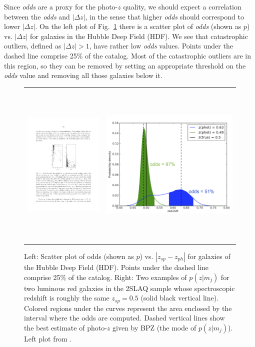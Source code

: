 Since \textit{odds} are a proxy for the photo-$z$ quality, we should expect a correlation between the \textit{odds} and $|\Delta z|$, in the sense that higher \textit{odds} should correspond to lower $|\Delta z|$. On the left plot of Fig.~\ref{fig:odds} there is a scatter plot of \textit{odds} (shown as $p$) vs. $|\Delta z|$ for galaxies in the Hubble Deep Field (HDF). We see that catastrophic outliers, defined as $|\Delta z|>1$, have rather low \textit{odds} values. Points under the dashed line comprise 25\% of the catalog. Most of the catastrophic outliers are in this region, so they can be removed by setting an appropriate threshold on the \textit{odds} value and removing all those galaxies below it.
\begin{figure}
\centering
\begin{tabular}{cc}
\includegraphics[height=76mm]{./plots/odds.pdf} & \includegraphics[height=80mm]{./plots/odds_example.png}
\end{tabular}
\caption{Left: Scatter plot of odds (shown as $p$) vs. $|z_{sp}-z_{ph}|$ for galaxies of the Hubble Deep Field (HDF). Points under the dashed line comprise 25\% of the catalog. Right: Two examples of $p(z|m_j)$ for two luminous red galaxies in the 2SLAQ sample whose spectroscopic redshift is roughly the same $z_{sp} = 0.5$ (solid black vertical line). Colored regions under the curves represent the area enclosed by the interval where the odds are computed. Dashed vertical lines show the best estimate of photo-$z$ given by BPZ (the mode of $p(z|m_j)$). Left plot from \citet{Benitez2000}.}
\label{fig:odds}
\end{figure}
